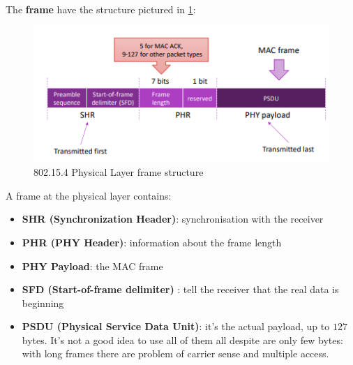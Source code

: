 \documentclass[10pt,a4paper]{report}
\theoremstyle{definition}
\begin{document}
The \textbf{frame} have the structure pictured in \ref{802-frame-structure}:

\begin{figure}[h]
	\centering\includegraphics[scale=0.60]{images/Pasted image 20230409095527.png}
	\caption{802.15.4 Physical Layer frame structure}
\label{802-frame-structure}
\end{figure}

A frame at the physical layer contains:
\begin{itemize}
	\item 
	\textbf{SHR (Synchronization Header)}: synchronisation with the receiver
	\item 
	\textbf{PHR (PHY Header)}: information about the frame length
	\item 
	\textbf{PHY Payload}: the MAC frame
	\item 
	\textbf{SFD (Start-of-frame delimiter)} : tell the receiver that the real data is beginning
	\item 
	\textbf{PSDU (Physical Service Data Unit)}: it's the actual payload, up to $127$ bytes. It's not a good idea to use all of them all despite are only few bytes: with long frames there are problem of carrier sense and multiple access.
\end{itemize}
\end{document}
